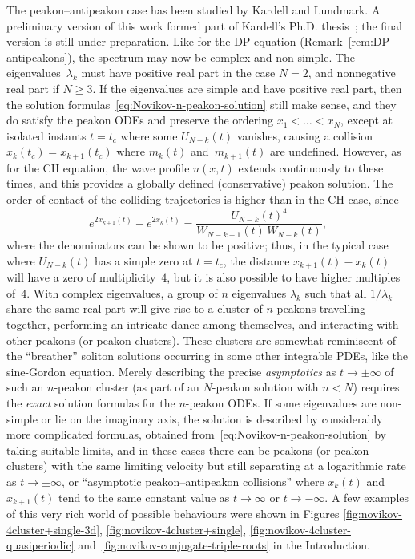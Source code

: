 \documentclass[10pt,a4paper]{article} \pdfoutput=1 
\begin{document}
\begin{remark}
  \label{rem:Novikov-peakon-antipeakon}
  The peakon--antipeakon case has been studied by Kardell and Lundmark.
  A preliminary version of this work formed part of Kardell's Ph.D. thesis~\cite{kardell:2016:phdthesis};
  the final version is still under preparation.
  Like for the DP equation (Remark~\ref{rem:DP-antipeakons}),
  the spectrum may now be complex and non-simple.
  The eigenvalues~$\lambda_k$ must have
  positive real part in the case $N=2$,
  and nonnegative real part if $N \ge 3$.
  If the eigenvalues are simple and have positive real part,
  then the solution formulas~\eqref{eq:Novikov-n-peakon-solution}
  still make sense, and they do satisfy the peakon ODEs
  and preserve the ordering $x_1 < \dots < x_N$,
  except at isolated instants $t=t_c$ where some $U_{N-k}(t)$ vanishes,
  causing a collision $x_{k}(t_c) = x_{k+1}(t_c)$ where $m_k(t)$ and~$m_{k+1}(t)$ are undefined.
  However, as for the CH equation,
  the wave profile $u(x,t)$ extends continuously to these times,
  and this provides a globally defined (conservative) peakon solution.
  The order of contact of the colliding trajectories is higher than in the CH case, since
  \begin{equation*}
    e^{2 x_{k+1}(t)} - e^{2 x_k(t)} = \frac{U_{N-k}(t)^4}{W_{N-k-1}(t) \, W_{N-k}(t)}
    ,
  \end{equation*}
  where the denominators can be shown to be positive;
  thus, in the typical case where $U_{N-k}(t)$ has a simple zero at $t=t_c$,
  the distance $x_{k+1}(t) - x_k(t)$ will have a zero of multiplicity~$4$,
  but it is also possible to have higher multiples of~$4$.
  With complex eigenvalues, a group of $n$ eigenvalues $\lambda_k$
  such that all $1/\lambda_k$ share the same real part
  will give rise to a cluster of $n$ peakons travelling together, performing
  an intricate dance among themselves, and interacting with other peakons (or peakon clusters).
  These clusters are somewhat reminiscent of the ``breather'' soliton solutions
  occurring in some other integrable PDEs, like the sine-Gordon equation.
  Merely describing the precise \emph{asymptotics} as $t \to \pm \infty$
  of such an $n$-peakon cluster (as part of an $N$-peakon solution with $n<N$)
  requires the \emph{exact} solution formulas for the $n$-peakon ODEs.
  If some eigenvalues are non-simple or lie on the imaginary axis,
  the solution is described by considerably more complicated formulas,
  obtained from~\eqref{eq:Novikov-n-peakon-solution} by taking suitable limits,
  and in these cases there can be peakons (or peakon clusters)
  with the same limiting velocity but still separating
  at a logarithmic rate as $t \to \pm \infty$,
  or ``asymptotic peakon--antipeakon collisions'' where $x_k(t)$ and $x_{k+1}(t)$ tend to the
  same constant value as $t \to \infty$ or $t \to -\infty$.
  A few examples of this very rich world of possible behaviours were
  shown in Figures
  \ref{fig:novikov-4cluster+single-3d},
  \ref{fig:novikov-4cluster+single},
  \ref{fig:novikov-4cluster-quasiperiodic}
  and~\ref{fig:novikov-conjugate-triple-roots}
  in the Introduction.
\end{remark}
\end{document}
